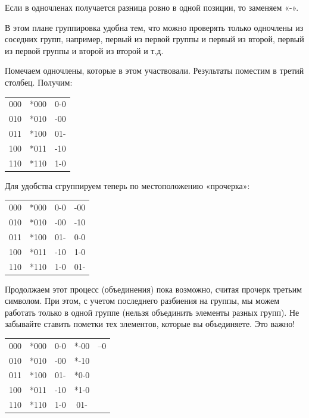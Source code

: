 \documentclass[11pt]{article}
\begin{document}
Если в одночленах получается разница ровно в одной позиции, то
заменяем «-».

В этом плане группировка удобна тем, что можно проверять только
одночлены из соседних групп, например, первый из первой группы и первый из
второй, первый из первой группы и второй из второй и т.д.

Помечаем одночлены, которые в этом участвовали. Результаты поместим
в третий столбец. Получим:

\begin{center}
\begin{tabular}{|c|c|c|}\hline
    000 & *000 & 0-0\\
    \cline{2-2}
    010 & *010 & -00\\
    011 & *100 & 01-\\
    \cline{2-2}
    100 & *011 & -10\\
    110 & *110 & 1-0\\
    \hline
\end{tabular}
\end{center}

Для удобства сгруппируем теперь по местоположению «прочерка»:

\begin{center}
\begin{tabular}{|c|c|c|c|}\hline
    000 & *000 & 0-0 & -00\\
    \cline{2-2}
    010 & *010 & -00 & -10\\
    \cline{4-4}
    011 & *100 & 01- & 0-0\\
    \cline{2-2}
    100 & *011 & -10 & 1-0\\
    \cline{4-4}
    110 & *110 & 1-0 & 01-\\
    \hline
\end{tabular}
\end{center}

Продолжаем этот процесс (объединения) пока возможно, считая прочерк
третьим символом. При этом, с учетом последнего разбиения на группы, мы
можем работать только в одной группе (нельзя объединить элементы разных
групп). Не забывайте ставить пометки тех элементов, которые вы объединяете.
Это важно!

\begin{center}
\begin{tabular}{|c|c|c|c|c|}\hline
	000 & *000 & 0-0 & *-00 & --0\\
    \cline{2-2}
	010 & *010 & -00 & *-10\\
    \cline{4-4}
    011 & *100 & 01- & *0-0\\
    \cline{2-2}
    100 & *011 & -10 & *1-0\\
    \cline{4-4}
    110 & *110 & 1-0 & 01-\\
    \hline
\end{tabular}
\end{center}
\end{document}
